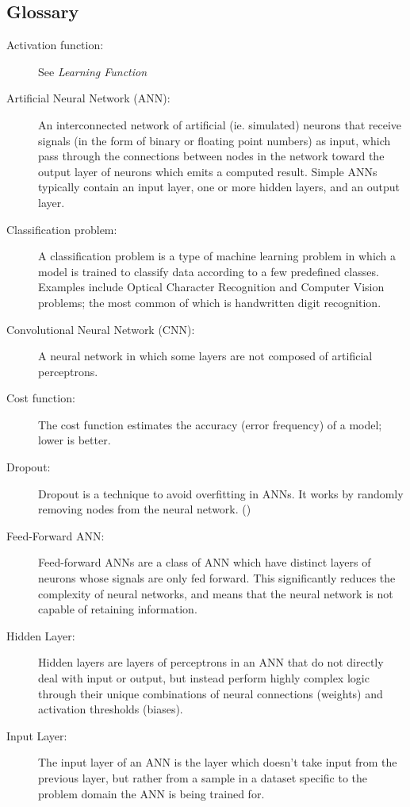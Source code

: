 \documentclass[]{report}
\begin{document}
\subsection{Glossary}
\begin{description}
\item[Activation function:] See \textit{Learning Function}

\item[Artificial Neural Network (ANN):] An interconnected network of artificial (ie. simulated) neurons that receive signals (in the form of binary or floating point numbers) as input, which pass through the connections between nodes in the network toward the output layer of neurons which emits a computed result. Simple ANNs typically contain an input layer, one or more hidden layers, and an output layer.

\item[Classification problem:] A classification problem is a type of machine learning problem in which a model is trained to classify data according to a few predefined classes. Examples include Optical Character Recognition and Computer Vision problems; the most common of which is handwritten digit recognition.

\item[Convolutional Neural Network (CNN):] A neural network in which some layers are not composed of artificial perceptrons.

\item[Cost function:] The cost function estimates the accuracy (error frequency) of a model; lower is better.

\item[Dropout:] Dropout is a technique to avoid overfitting in ANNs. It works by randomly removing nodes from the neural network. (\cite{dropout14})

\item[Feed-Forward ANN:] Feed-forward ANNs are a class of ANN which have distinct layers of neurons whose signals are only fed forward. This significantly reduces the complexity of neural networks, and means that the neural network is not capable of retaining information.

\item[Hidden Layer:] Hidden layers are layers of perceptrons in an ANN that do not directly deal with input or output, but instead perform highly complex logic through their unique combinations of neural connections (weights) and activation thresholds (biases).

\item[Input Layer:] The input layer of an ANN is the layer which doesn't take input from the previous layer, but rather from a sample in a dataset specific to the problem domain the ANN is being trained for.


\end{description}
\end{document}

